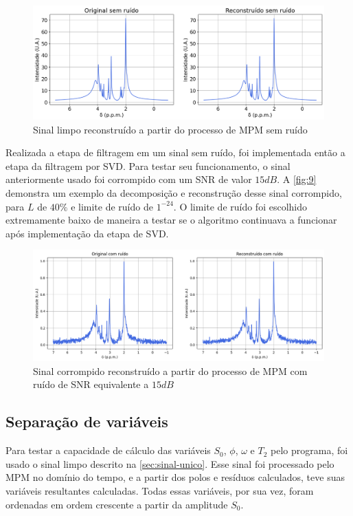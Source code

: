 \documentclass[12pt]{article}
\begin{document}
\begin{figure} [H]
    \includegraphics[scale=0.5]{mpm-sem-ruido.png}
    \centering
    \caption{Sinal limpo reconstruído a partir do processo de MPM sem ruído}
    \label{fig:8}
\end{figure}

Realizada a etapa de filtragem em um sinal sem ruído, foi implementada então a etapa da filtragem por SVD. Para testar seu funcionamento, o sinal
anteriormente usado foi corrompido com um SNR de valor $15 dB$. A \autoref{fig:9} demonstra um exemplo da decomposição e reconstrução desse sinal 
corrompido, para $L$ de $40\%$ e limite de ruído de $1^{-24}$. O limite de ruído foi escolhido extremamente baixo de maneira a testar se o algoritmo 
continuava a funcionar após implementação da etapa de SVD. 

\begin{figure} [H]
    \includegraphics[scale=0.5]{mpm-com-ruido.png}
    \centering
    \caption{Sinal corrompido reconstruído a partir do processo de MPM com ruído de SNR equivalente a $15 dB$}
    \label{fig:9}
\end{figure}

\subsection{Separação de variáveis}

Para testar a capacidade de cálculo das variáveis $S_0$, $\phi$, $\omega$ e $T_2$ pelo programa, foi usado o sinal limpo descrito na \autoref{sec:sinal-unico}. 
Esse sinal foi processado pelo MPM no domínio do tempo, e a partir dos polos e resíduos calculados, teve suas variáveis resultantes calculadas. Todas essas 
variáveis, por sua vez, foram ordenadas em ordem crescente a partir da amplitude $S_0$.
\end{document}

